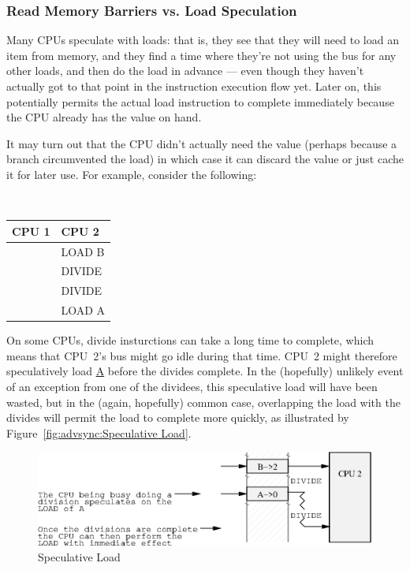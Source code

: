 \subsubsection{Read Memory Barriers vs. Load Speculation}
\label{sec:advsync:Read Memory Barriers vs. Load Speculation}

Many CPUs speculate with loads: that is, they see that they will need to
load an item from memory, and they find a time where they're not using
the bus for any other loads, and then do the load in advance --- even though
they haven't actually got to that point in the instruction execution
flow yet.
Later on, this potentially permits the actual load instruction to
complete immediately because the CPU already has the value on hand.

It may turn out that the CPU didn't actually need the value (perhaps because a
branch circumvented the load) in which case it can discard the value or just
cache it for later use.
For example, consider the following:

\vspace{5pt}
\begin{minipage}[t]{\columnwidth}
\tt
\begin{tabular}{l|p{1.5in}}
	CPU 1 &		CPU 2 \\
	\hline
		&	LOAD B \\
		&	DIVIDE \\
		&	DIVIDE \\
		&	LOAD A \\
\end{tabular}
\end{minipage}
\vspace{5pt}

On some CPUs, divide insturctions can take a long time to complete,
which means that CPU~2's bus might go idle during that time.
CPU~2 might therefore speculatively load \url{A} before the divides
complete.
In the (hopefully) unlikely event of an exception from one of the dividees,
this speculative load will have been wasted, but in the (again, hopefully)
common case, overlapping the load with the divides will permit the load
to complete more quickly, as illustrated by
Figure~\ref{fig:advsync:Speculative Load}.

\begin{figure}[htb]
\begin{center}
\includegraphics{advsync/SpeculativeLoad}
\end{center}
\caption{Speculative Load}
\end{figure}

